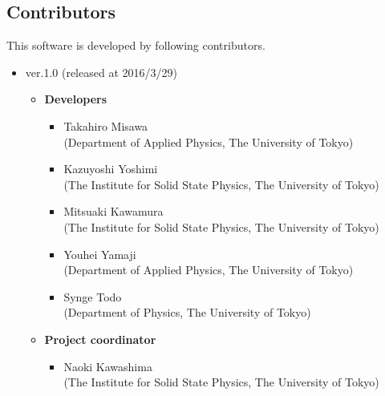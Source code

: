 \subsection{Contributors}
\label{subsec:contributors}
This software is developed by following contributors.
\begin{itemize}
\item{ver.1.0 (released at 2016/3/29)}
\begin{itemize}
	\item{\bf Developers}
	\begin{itemize}
	\item{Takahiro Misawa \\(Department of Applied Physics, The University of Tokyo)}
	\item{Kazuyoshi Yoshimi\\ (The Institute for Solid State Physics, The University of Tokyo)}
	\item{Mitsuaki Kawamura\\ (The Institute for Solid State Physics, The University of Tokyo)}
	\item{Youhei Yamaji\\ (Department of Applied Physics, The University of Tokyo)}
	\item{Synge Todo\\ (Department of Physics, The University of Tokyo)}
	\end{itemize}
	\item{\bf Project coordinator}
	\begin{itemize}
	\item{Naoki Kawashima\\ (The Institute for Solid State Physics, The University of Tokyo)}
	\end{itemize}
\end{itemize}


\end{itemize}

